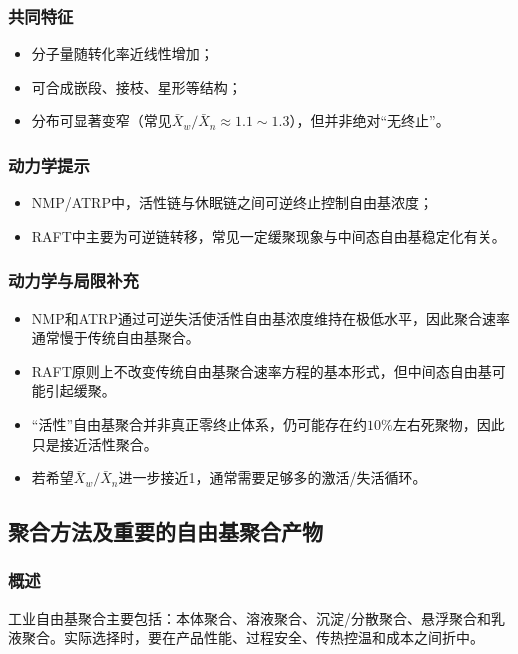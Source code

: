 ﻿\documentclass[12pt,a4paper]{article}
\begin{document}
\subsubsection{共同特征}
\begin{itemize}
  \item 分子量随转化率近线性增加；
  \item 可合成嵌段、接枝、星形等结构；
  \item 分布可显著变窄（常见$\bar{X}_w/\bar{X}_n\approx1.1\sim1.3$），但并非绝对“无终止”。
\end{itemize}

\subsubsection{动力学提示}
\begin{itemize}
  \item NMP/ATRP中，活性链与休眠链之间可逆终止控制自由基浓度；
  \item RAFT中主要为可逆链转移，常见一定缓聚现象与中间态自由基稳定化有关。
\end{itemize}

\subsubsection{动力学与局限补充}
\begin{itemize}
  \item NMP和ATRP通过可逆失活使活性自由基浓度维持在极低水平，因此聚合速率通常慢于传统自由基聚合。
  \item RAFT原则上不改变传统自由基聚合速率方程的基本形式，但中间态自由基可能引起缓聚。
  \item “活性”自由基聚合并非真正零终止体系，仍可能存在约$10\%$左右死聚物，因此只是接近活性聚合。
  \item 若希望$\bar{X}_w/\bar{X}_n$进一步接近1，通常需要足够多的激活/失活循环。
\end{itemize}

\subsection{聚合方法及重要的自由基聚合产物}
\subsubsection{概述}
工业自由基聚合主要包括：本体聚合、溶液聚合、沉淀/分散聚合、悬浮聚合和乳液聚合。实际选择时，要在产品性能、过程安全、传热控温和成本之间折中。
\end{document}

